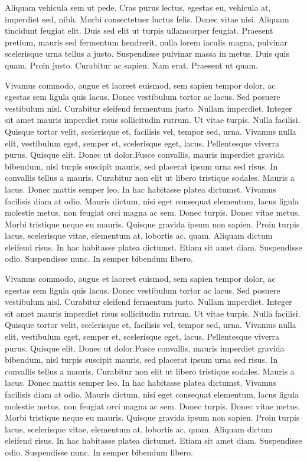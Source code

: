 Aliquam vehicula sem ut pede. Cras purus lectus, egestas eu, vehicula at, imperdiet sed, nibh. Morbi consectetuer luctus felis. Donec vitae nisi. Aliquam tincidunt feugiat elit. Duis sed elit ut turpis ullamcorper feugiat. Praesent pretium, mauris sed fermentum hendrerit, nulla lorem iaculis magna, pulvinar scelerisque urna tellus a justo. Suspendisse pulvinar massa in metus. Duis quis quam. Proin justo. Curabitur ac sapien. Nam erat. Praesent ut quam.

Vivamus commodo, augue et laoreet euismod, sem sapien tempor dolor, ac egestas sem ligula quis lacus. Donec vestibulum tortor ac lacus. Sed posuere vestibulum nisl. Curabitur eleifend fermentum justo. Nullam imperdiet. Integer sit amet mauris imperdiet risus sollicitudin rutrum. Ut vitae turpis. Nulla facilisi. Quisque tortor velit, scelerisque et, facilisis vel, tempor sed, urna. Vivamus nulla elit, vestibulum eget, semper et, scelerisque eget, lacus. Pellentesque viverra purus. Quisque elit. Donec ut dolor.Fusce convallis, mauris imperdiet gravida bibendum, nisl turpis suscipit mauris, sed placerat ipsum urna sed risus. In convallis tellus a mauris. Curabitur non elit ut libero tristique sodales. Mauris a lacus. Donec mattis semper leo. In hac habitasse platea dictumst. Vivamus facilisis diam at odio. Mauris dictum, nisi eget consequat elementum, lacus ligula molestie metus, non feugiat orci magna ac sem. Donec turpis. Donec vitae metus. Morbi tristique neque eu mauris. Quisque gravida ipsum non sapien. Proin turpis lacus, scelerisque vitae, elementum at, lobortis ac, quam. Aliquam dictum eleifend risus. In hac habitasse platea dictumst. Etiam sit amet diam. Suspendisse odio. Suspendisse nunc. In semper bibendum libero.

Vivamus commodo, augue et laoreet euismod, sem sapien tempor dolor, ac egestas sem ligula quis lacus. Donec vestibulum tortor ac lacus. Sed posuere vestibulum nisl. Curabitur eleifend fermentum justo. Nullam imperdiet. Integer sit amet mauris imperdiet risus sollicitudin rutrum. Ut vitae turpis. Nulla facilisi. Quisque tortor velit, scelerisque et, facilisis vel, tempor sed, urna. Vivamus nulla elit, vestibulum eget, semper et, scelerisque eget, lacus. Pellentesque viverra purus. Quisque elit. Donec ut dolor.Fusce convallis, mauris imperdiet gravida bibendum, nisl turpis suscipit mauris, sed placerat ipsum urna sed risus. In convallis tellus a mauris. Curabitur non elit ut libero tristique sodales. Mauris a lacus. Donec mattis semper leo. In hac habitasse platea dictumst. Vivamus facilisis diam at odio. Mauris dictum, nisi eget consequat elementum, lacus ligula molestie metus, non feugiat orci magna ac sem. Donec turpis. Donec vitae metus. Morbi tristique neque eu mauris. Quisque gravida ipsum non sapien. Proin turpis lacus, scelerisque vitae, elementum at, lobortis ac, quam. Aliquam dictum eleifend risus. In hac habitasse platea dictumst. Etiam sit amet diam. Suspendisse odio. Suspendisse nunc. In semper bibendum libero.



